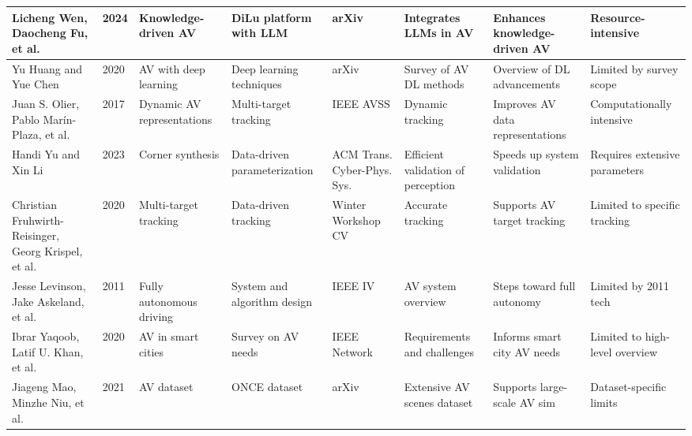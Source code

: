 \documentclass[lettersize,journal]{IEEEtran}
\begin{document}
\begin{longtable}{|p{2cm}|p{1cm}|p{2cm}|p{2cm}|p{2cm}|p{2cm}|p{2cm}|p{2.5cm}|}
Licheng Wen, Daocheng Fu, et al. & 2024 & Knowledge-driven AV & DiLu platform with LLM & arXiv & Integrates LLMs in AV & Enhances knowledge-driven AV & Resource-intensive \\
\hline
Yu Huang and Yue Chen & 2020 & AV with deep learning & Deep learning techniques & arXiv & Survey of AV DL methods & Overview of DL advancements & Limited by survey scope \\
\hline
Juan S. Olier, Pablo Marín-Plaza, et al. & 2017 & Dynamic AV representations & Multi-target tracking & IEEE AVSS & Dynamic tracking & Improves AV data representations & Computationally intensive \\
\hline
Handi Yu and Xin Li & 2023 & Corner synthesis & Data-driven parameterization & ACM Trans. Cyber-Phys. Sys. & Efficient validation of perception & Speeds up system validation & Requires extensive parameters \\
\hline
Christian Fruhwirth-Reisinger, Georg Krispel, et al. & 2020 & Multi-target tracking & Data-driven tracking & Winter Workshop CV & Accurate tracking & Supports AV target tracking & Limited to specific tracking \\
\hline
Jesse Levinson, Jake Askeland, et al. & 2011 & Fully autonomous driving & System and algorithm design & IEEE IV & AV system overview & Steps toward full autonomy & Limited by 2011 tech \\
\hline
Ibrar Yaqoob, Latif U. Khan, et al. & 2020 & AV in smart cities & Survey on AV needs & IEEE Network & Requirements and challenges & Informs smart city AV needs & Limited to high-level overview \\
\hline
Jiageng Mao, Minzhe Niu, et al. & 2021 & AV dataset & ONCE dataset & arXiv & Extensive AV scenes dataset & Supports large-scale AV sim & Dataset-specific limits \\
\hline


\end{longtable}

\twocolumn
\end{document}
